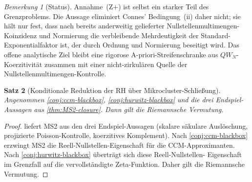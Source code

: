 \documentclass[12pt,a4paper]{article}
\newtheorem{theorem}{Satz}[section]
\theoremstyle{definition}
\theoremstyle{remark}
\newtheorem{remark}[theorem]{Bemerkung}
\begin{document}
\begin{remark}[Status]
Annahme~(Z+) ist selbst ein starker Teil des Grenzproblems. Die Aussage
eliminiert Connes' Bedingung~(ii) daher nicht; sie hält nur fest, dass nach
bereits anderweitig gelieferter Nullstellenmultimengen-Koinzidenz und
Normierung die verbleibende Mehrdeutigkeit der Standard-Exponentialfaktor
ist, der durch Ordnung und Normierung beseitigt wird. Das offene
analytische Ziel bleibt eine rigorose A-priori-Streifenschranke aus
$QW_N$-Koerzitivität zusammen mit einer nicht-zirkulären Quelle der
Nullstellenmultimengen-Kontrolle.
\end{remark}

\begin{theorem}[Konditionale Reduktion der RH über Mikrocluster-Schließung]
\label{thm:RH-conditional}
Angenommen \cref{conj:ccm-blackbox}, \cref{conj:hurwitz-blackbox} und die
drei Endspiel-Aussagen aus \cref{thm:MS2-closure}. Dann gilt die
Riemannsche Vermutung.
\end{theorem}

\begin{proof}
 liefert MS2 aus den drei Endspiel-Aussagen
(skalare säkulare Auslöschung, projizierte Poisson-Kontrolle, koerzitives
Komplement). Nach \cref{conj:ccm-blackbox} erzwingt MS2 die
Reell-Nullstellen-Eigenschaft für die CCM-Approximanten. Nach
\cref{conj:hurwitz-blackbox} überträgt sich diese Reell-Nullstellen-
Eigenschaft im Grenzfall auf die vervollständigte Zeta-Funktion. Daher gilt
die Riemannsche Vermutung.
\end{proof}
\end{document}
